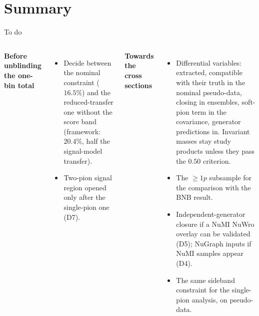 \documentclass[aspectratio=169,10pt]{beamer}
\begin{document}
\section{Summary}

\begin{frame}{To do}
  \begin{columns}[T]
  \textbf{\color{ubred}Before unblinding the one-bin total}
  \begin{itemize}\footnotesize\setlength\itemsep{2pt}
    \item Decide between the nominal constraint ($16.5\%$) and the reduced-transfer one without the score band
          (framework: $20.4\%$, half the signal-model transfer).
    \item Two-pion signal region opened only after the single-pion one (D7).
  \end{itemize}
  \textbf{\color{ubred}Towards the cross sections}
  \begin{itemize}\footnotesize\setlength\itemsep{2pt}
    \item Differential variables: extracted, compatible with their truth in the nominal pseudo-data, closing in ensembles, soft-pion term in the covariance, generator predictions
          in. Invariant masses stay study products unless they pass the $0.50$ criterion.
    \item The $\geq1p$ subsample for the comparison with the BNB result.
    \item Independent-generator closure if a NuMI NuWro overlay can be validated (D5); NuGraph inputs if
          NuMI samples appear (D4).
    \item The same sideband constraint for the single-pion analysis, on pseudo-data.
  \end{itemize}
  \end{columns}
\end{frame}
\end{document}
